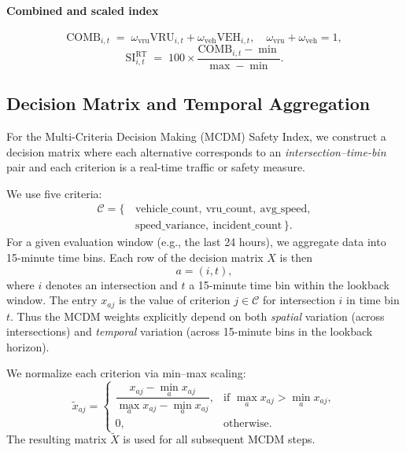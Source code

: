 \documentclass[conference]{IEEEtran}
\begin{document}
\paragraph{Combined and scaled index}
\begin{equation}
\mathrm{COMB}_{i,t} \;=\; \omega_{\text{vru}}\mathrm{VRU}_{i,t} + \omega_{\text{veh}}\mathrm{VEH}_{i,t},\quad
\omega_{\text{vru}}+\omega_{\text{veh}}=1,
\end{equation}
\begin{equation}
\mathrm{SI}^{\text{RT}}_{i,t} \;=\; 100 \times
\frac{\mathrm{COMB}_{i,t}-\min}{\max-\min}.
\end{equation}

\subsection{Decision Matrix and Temporal Aggregation}

For the Multi-Criteria Decision Making (MCDM) Safety Index, we construct a
decision matrix where each alternative corresponds to an
\emph{intersection--time-bin} pair and each criterion is a real-time traffic or
safety measure.

We use five criteria:
\begin{equation}
\begin{aligned}
\mathcal{C} = \{\, 
&\text{vehicle\_count},\ \text{vru\_count},\ \text{avg\_speed},\\
&\text{speed\_variance},\ \text{incident\_count}
\,\}.
\end{aligned}
\end{equation}
For a given evaluation window (e.g., the last 24 hours), we aggregate data into
15-minute time bins. Each row of the decision matrix $X$ is then
\[
a = (i,t),
\]
where $i$ denotes an intersection and $t$ a 15-minute time bin within the
lookback window. The entry $x_{a j}$ is the value of criterion $j \in \mathcal{C}$
for intersection $i$ in time bin $t$. Thus the MCDM weights explicitly depend on
both \emph{spatial} variation (across intersections) and \emph{temporal}
variation (across 15-minute bins in the lookback horizon).

We normalize each criterion via min--max scaling:
\begin{equation}
\tilde x_{a j}
=
\begin{cases}
\dfrac{x_{a j} - \min_a x_{a j}}{\max_a x_{a j} - \min_a x_{a j}}, & \text{if }\max_a x_{a j} > \min_a x_{a j},\\[0.8em]
0, & \text{otherwise}.
\end{cases}
\end{equation}
The resulting matrix $\tilde X$ is used for all subsequent MCDM steps.
\end{document}
